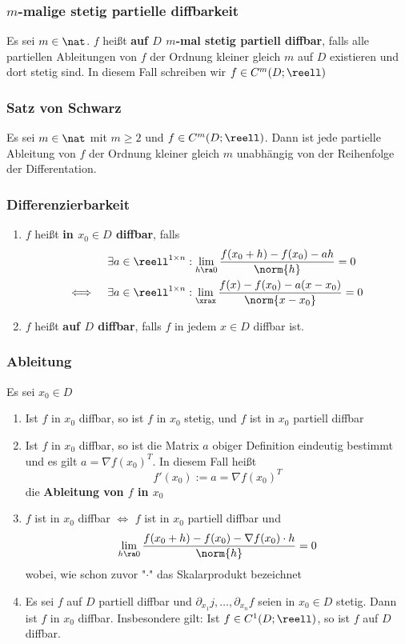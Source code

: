 \documentclass{kit}
\begin{document}
    \subsubsection{\texorpdfstring{$m$}{}-malige stetig partielle diffbarkeit}
      Es sei $m\in\nat$. $f$ heißt \textbf{auf $D$ $m$-mal stetig partiell diffbar}, falls alle partiellen Ableitungen von
      $f$ der Ordnung kleiner gleich $m$ auf $D$ existieren und dort stetig sind. In diesem Fall schreiben wir 
      $f\in C^m(D;\reell)$
    \subsubsection{Satz von Schwarz}
      Es sei $m\in\nat$ mit $m\ge2$ und $f\in C^m(D;\reell)$. Dann ist jede partielle Ableitung von $f$ der Ordnung kleiner
      gleich $m$ unabhängig von der Reihenfolge der Differentation.
    \subsubsection{Differenzierbarkeit}
      \begin{enumerate}
        \item $f$ heißt \textbf{in $x_0\in D$ diffbar}, falls 
          $$\begin{aligned}
              & \exists a\in\reell^{1\times n}:\lim_{h\ra0}\frac{f(x_0+h)-f(x_0)-ah}{\norm{h}}=0\\
            \Longleftrightarrow\hspace{0.5cm} & \exists a\in\reell^{1\times n}:\lim_\xrax\frac{f(x)-f(x_0)-a(x-x_0)}
            {\norm{x-x_0}}=0
          \end{aligned}$$
        \item $f$ heißt \textbf{auf $D$ diffbar}, falls $f$ in jedem $x\in D$ diffbar ist.
      \end{enumerate}
    \subsubsection{Ableitung}
      Es sei $x_0\in D$
      \begin{enumerate}
        \item Ist $f$ in $x_0$ diffbar, so ist $f$ in $x_0$ stetig, und $f$ ist in $x_0$ partiell diffbar
        \item Ist $f$ in $x_0$ diffbar, so ist die Matrix $a$ obiger Definition eindeutig bestimmt und es gilt 
          $a=\nabla f(x_0)^T$. In diesem Fall heißt
          $$f'(x_0):=a=\nabla f(x_0)^T$$
          die \textbf{Ableitung von $f$ in $x_0$}
        \item $f$ ist in $x_0$ diffbar $\Longleftrightarrow$ $f$ ist in $x_0$ partiell diffbar und
          $$\lim_{h\ra0}\frac{f(x_0+h)-f(x_0)-\nabla f(x_0)\cdot h}{\norm{h}}=0$$
          wobei, wie schon zuvor "$\cdot$" das Skalarprodukt bezeichnet
        \item Es sei $f$ auf $D$ partiell diffbar und $\partial_{x_1}j,\dots,\partial_{x_n}f$ seien in $x_0\in D$ stetig.
          Dann ist $f$ in $x_0$ diffbar. Insbesondere gilt: Ist $f\in C^1(D;\reell)$, so ist $f$ auf $D$ diffbar.
      \end{enumerate}
\end{document}
